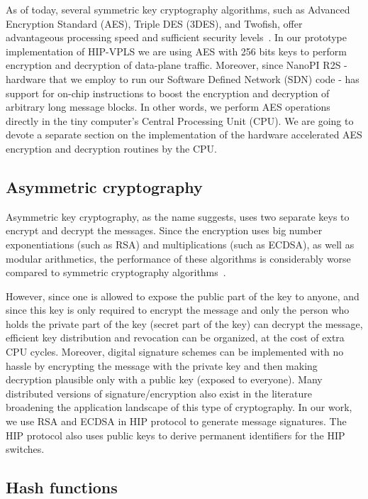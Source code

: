 As of today, several symmetric key cryptography algorithms, such as Advanced 
Encryption Standard (AES), Triple DES (3DES), and Twofish, offer advantageous 
processing speed and sufficient security levels~\cite{Stinson:Cryptography}. In our prototype implementation 
of HIP-VPLS we are using AES with 256 bits keys to perform encryption and 
decryption of data-plane traffic. Moreover, since NanoPI R2S - hardware that 
we employ to run our Software Defined Network (SDN) code - has support for 
on-chip instructions to boost the encryption and decryption of arbitrary long 
message blocks. In other words, we perform AES operations directly in the tiny 
computer's Central Processing Unit (CPU). We are going to devote a separate 
section on the implementation of the hardware accelerated AES encryption and 
decryption routines by the CPU.

\subsection{Asymmetric cryptography}

Asymmetric key cryptography, as the name suggests, uses two separate keys to 
encrypt and decrypt the messages. Since the encryption uses big number 
exponentiations (such as RSA) and multiplications (such as ECDSA), as well 
as modular arithmetics, the performance of these algorithms is considerably 
worse compared to symmetric cryptography algorithms~\cite{Stinson:Cryptography}. 

However, since one is allowed to expose the public part of the key to anyone, 
and since this key is only required to encrypt the message and only the person 
who holds the private part of the key (secret part of the key) can decrypt the 
message, efficient key distribution and revocation can be organized, at the 
cost of extra CPU cycles. Moreover, digital signature schemes can be implemented 
with no hassle by encrypting the message with the private key and then making 
decryption plausible only with a public key (exposed to everyone). Many distributed 
versions of signature/encryption also exist in the literature broadening the 
application landscape of this type of cryptography. In our work, we use RSA and 
ECDSA in HIP protocol to generate message signatures. The HIP protocol also uses 
public keys to derive permanent identifiers for the HIP switches.
 

\subsection{Hash functions}

